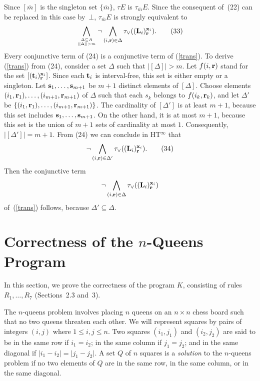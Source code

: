 \documentclass{tlp}
\def\o{\overline}
\def\beq{\begin{equation}}
\def\eeq#1{\label{#1}\end{equation}}
\begin{document}
\begin{proof*}
Since $[\o m]$ is the singleton set $\{\o m\}$,
$\tau E$ is $\tau_{\o m} E$.
Since the
consequent of~(22) can be replaced in this case by~$\bot$,
$\tau_{\o m} E$ is strongly equivalent to
\[
  \bigwedge_{\Delta \subseteq A \atop \lvert [\Delta] \rvert > m}
  \neg \bigwedge_{(i, {\bf r}) \in\Delta}
  \tau_{\lor}(({\bf L}_i)^{{\bf x}_i}_{\bf r}).
\tag{33}
\label{trans}
\]
Every conjunctive term of (24) is a conjunctive term of
(\ref{trans}). To derive (\ref{trans}) from (24), consider a
set $\Delta$ such that $\lvert [\Delta] \rvert > m$.
Let $f(i,{\bf r})$ stand for the set
$[({\bf t}_i)^{{\bf x}_i}_{\bf r}]$. Since each ${\bf t}_i$ is
interval-free, this set is either empty or a singleton.
Let ${\bf s}_1,\dots,{\bf s}_{m+1}$
be $m+1$ distinct elements of $[\Delta]$.
Choose elements $(i_1,{\bf r}_1),\dots,(i_{m+1},{\bf r}_{m+1})$ of
$\Delta$ such that each $s_k$ belongs to $f(i_k,{\bf r}_k)$, and let
$\Delta'$ be $\{(i_1,{\bf r}_1),\dots,(i_{m+1},{\bf r}_{m+1})\}$.
The cardinality of $[\Delta']$ is at least $m+1$, because this set
includes ${\bf s}_1,\dots,{\bf s}_{m+1}$.  On the other hand, it is at
most $m+1$, because this set is the union of $m+1$ sets of cardinality at
most $1$.
Consequently, $\lvert [\Delta']\rvert = m+1$.  From (24)
we can conclude in HT\/$^\infty$ that
\[
  \neg \bigwedge_{(i, {\bf r}) \in\Delta'} \tau_{\lor}
  (({\bf L}_i)^{{\bf x}_i}_{\bf r}).
\tag{34}
\label{cterm}
\]
Then the conjunctive term
$$\neg \bigwedge_{(i, {\bf r}) \in\Delta}
  \tau_{\lor}(({\bf L}_i)^{{\bf x}_i}_{\bf r})$$
of~(\ref{trans}) follows, because $\Delta' \subseteq \Delta$.\end{proof*}

\section*{Correctness of the $n$-Queens Program} \label{sec:nqueens}

In this section, we prove the correctness of the program $K$,
consisting of rules $R_1,\dots,R_7$ (Sections~2.3 and~3).

The $n$-queens problem involves placing $n$ queens on an $n \times n$
chess board such that no two queens threaten each other. We will represent
squares by pairs of integers $(i, j)$ where
\hbox{$1 \leq i,j \leq n$}. Two squares $(i_1, j_1)$ and $(i_2, j_2)$ are said
to be in the same row if $i_1 = i_2$; in the same column
if $j_1 = j_2$; and in the same diagonal if $\lvert i_1 - i_2 \rvert =
\lvert j_1 - j_2 \rvert$.
A set $Q$ of $n$ squares is a {\sl solution} to the $n$-queens problem if
no two elements of $Q$ are in the same row,
in the same column,
or in the same diagonal.
\end{document}
